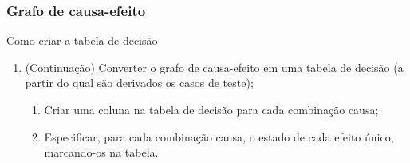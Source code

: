 \begin{frame}
\frametitle{Grafo de causa-efeito}

\begin{block:procedure}{Como criar a tabela de decisão}
\begin{enumerate}
	\item (Continuação) Converter o grafo de causa-efeito em uma tabela de decisão
	(a partir do qual são derivados os casos de teste);
	\begin{enumerate}
		\item Criar uma coluna na tabela de decisão para cada combinação causa;

		\item Especificar, para cada combinação causa, o estado de cada efeito
		único, marcando-os na tabela.
	\end{enumerate}
\end{enumerate}
\end{block:procedure}
\end{frame}


%

